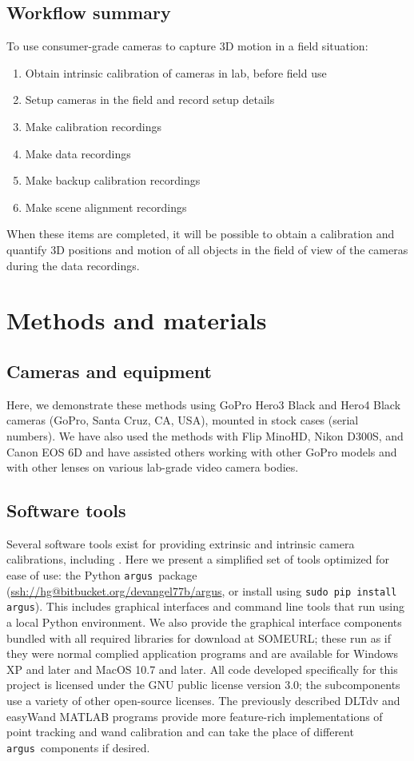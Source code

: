 \documentclass[fleqn,10pt]{wlpeerj}
\makeatletter
\newcommand{\argus}{\texttt{argus}}
\newcommand{\pipcommand}{\texttt{sudo pip install argus}}
\newcommand{\argusrepo}{\url{ssh://hg@bitbucket.org/devangel77b/argus}}
\makeatother
\begin{document}
\subsection*{Workflow summary}

To use consumer-grade cameras to capture 3D motion in a field situation:
\begin{enumerate}
\item{Obtain intrinsic calibration of cameras in lab, before field use}
\item{Setup cameras in the field and record setup details}
\item{Make calibration recordings}
\item{Make data recordings}
\item{Make backup calibration recordings}
\item{Make scene alignment recordings}
\end{enumerate}

When these items are completed, it will be possible to obtain a calibration and quantify 3D positions and motion of all objects in the field of view of the cameras during the data recordings.  

\section*{Methods and materials}
\subsection*{Cameras and equipment}
Here, we demonstrate these methods using GoPro Hero3 Black and Hero4 Black cameras (GoPro, Santa Cruz, CA, USA), mounted in stock cases (serial numbers).  We have also used the methods with Flip MinoHD, Nikon D300S, and Canon EOS 6D and have assisted others working with other GoPro models and with other lenses on various lab-grade video camera bodies.


\subsection*{Software tools}
Several software tools exist for providing extrinsic and intrinsic camera calibrations, including \citep{bouguet2004camera,Hedrick2008,lour09,Theriault:2014}.  Here we present a simplified set of tools optimized for ease of use: the Python \argus\ package (\argusrepo, or install using \pipcommand). This includes graphical interfaces and command line tools that run using a local Python environment. We also provide the graphical interface components bundled with all required libraries for download at SOMEURL; these run as if they were normal complied application programs and are available for Windows XP and later and MacOS 10.7 and later. All code developed specifically for this project is licensed under the GNU public license version 3.0; the subcomponents use a variety of other open-source licenses. The previously described DLTdv \citep{Hedrick2008} and easyWand \citep{Theriault:2014} MATLAB programs provide more feature-rich implementations of point tracking and wand calibration and can take the place of different \argus\ components if desired.
\end{document}
